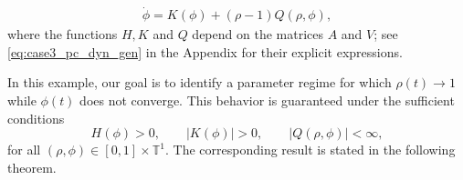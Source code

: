 \documentclass[10pt]{article}
\theoremstyle{definition}
\theoremstyle{definition}
\numberwithin{equation}{section}
\newcommand{\BBT}{\mathbb{T}}
\newcommand{\Dphi}{\Dot{\phi}}
\begin{document}
\begin{equation}\label{eq:pc_dyn_case_3}
\begin{aligned}
\Dphi = K(\phi) + (\rho-1) Q(\rho, \phi),
\end{aligned}
\end{equation}
where the functions $H, K$ and $Q$ depend on the matrices $A$ and $V$; see \eqref{eq:case3_pc_dyn_gen} in the Appendix for their explicit expressions.

In this example, our goal is to identify a parameter regime for which $\rho(t) \rightarrow 1$ while $\phi(t)$ does not converge.
This behavior is guaranteed under the sufficient conditions
\begin{equation*}
H(\phi) > 0, \qquad |K(\phi)| > 0, \qquad |Q(\rho, \phi)| < \infty,
\end{equation*}
for all $(\rho, \phi) \in [0,1] \times \BBT^1$.
The corresponding result is stated in the following theorem.
\end{document}
